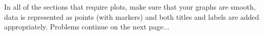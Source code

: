 In all of the sections that require plots, make sure that your graphs are smooth, data is represented as points (with markers) and both titles and labels are added appropriately.
Problems continue on the next page...
\newpage
{}
